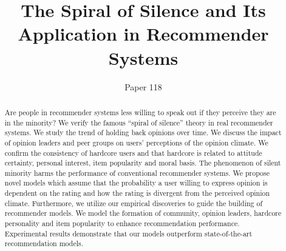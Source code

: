 \documentclass[sigconf]{acmart}
\begin{document}
\title{The Spiral of Silence and Its Application in Recommender Systems}
\author{Paper 118}


\begin{abstract}
Are people in recommender systems less willing to speak out if they perceive they are in the minority? We verify the famous ``spiral of silence'' theory in real recommender systems. We study the trend of holding back opinions over time. We discuss the impact of opinion leaders and peer groups on users' perceptions of the opinion climate. We confirm the consistency of hardcore users and that hardcore is related to attitude certainty, personal interest, item popularity and moral basis. The phenomenon of silent minority harms the performance of conventional recommender systems. We propose novel models which assume that the probability a user willing to express opinion is dependent on the rating and how the rating is divergent from the perceived opinion climate. Furthermore, we utilize our empirical discoveries to guide the building of recommender models. We model the formation of community, opinion leaders, hardcore personality and item popularity to enhance recommendation performance.  Experimental results demonstrate that our models  outperform state-of-the-art recommendation models.
  
\end{abstract}
\end{document}

